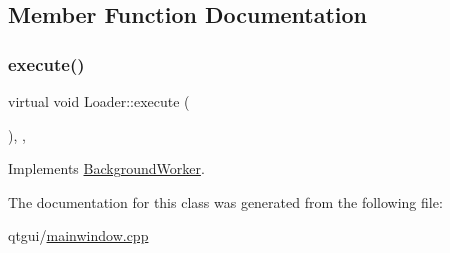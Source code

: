 \subsection{Member Function Documentation}
\mbox{\label{class_loader_abdb17a0ee918aa7b19d53b9c909cfb60}} 
\subsubsection{\texorpdfstring{execute()}{execute()}}
{\footnotesize\ttfamily virtual void Loader\+::execute (\begin{DoxyParamCaption}{ }\end{DoxyParamCaption})\hspace{0.3cm}{\ttfamily [inline]}, {\ttfamily [override]}, {\ttfamily [virtual]}}



Implements \mbox{\hyperlink{class_background_worker_ad9a721283a7c4aeb7c7a928ff677da00}{Background\+Worker}}.



The documentation for this class was generated from the following file\+:\begin{DoxyCompactItemize}
\item 
qtgui/\mbox{\hyperlink{qtgui_2mainwindow_8cpp}{mainwindow.\+cpp}}\end{DoxyCompactItemize}
